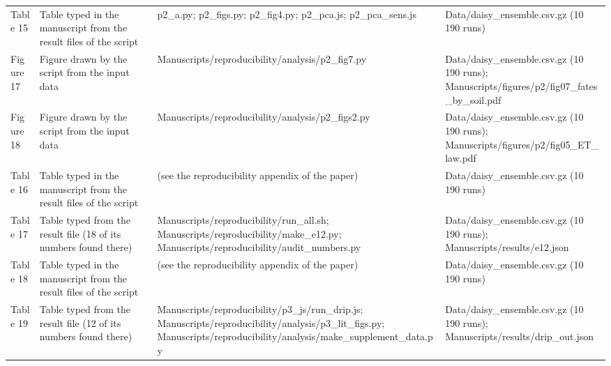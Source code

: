 {\begin{longtable}{p{}p{}p{}p{}}
{}Table 15 & Table typed in the manuscript from the result files of the script & p2\_\allowbreak{}a.py;  p2\_\allowbreak{}figs.py;  p2\_\allowbreak{}fig4.py;  p2\_\allowbreak{}pca.js;  p2\_\allowbreak{}pca\_\allowbreak{}sens.js & Data/\allowbreak{}daisy\_\allowbreak{}ensemble.csv.gz (10 190 runs)\\
{}Figure 17 & Figure drawn by the script from the input data & Manuscripts/\allowbreak{}reproducibility/\allowbreak{}analysis/\allowbreak{}p2\_\allowbreak{}fig7.py & Data/\allowbreak{}daisy\_\allowbreak{}ensemble.csv.gz (10 190 runs);  Manuscripts/\allowbreak{}figures/\allowbreak{}p2/\allowbreak{}fig07\_\allowbreak{}fates\_\allowbreak{}by\_\allowbreak{}soil.pdf\\
{}Figure 18 & Figure drawn by the script from the input data & Manuscripts/\allowbreak{}reproducibility/\allowbreak{}analysis/\allowbreak{}p2\_\allowbreak{}figs2.py & Data/\allowbreak{}daisy\_\allowbreak{}ensemble.csv.gz (10 190 runs);  Manuscripts/\allowbreak{}figures/\allowbreak{}p2/\allowbreak{}fig05\_\allowbreak{}ET\_\allowbreak{}law.pdf\\
{}Table 16 & Table typed in the manuscript from the result files of the script & (see the reproducibility appendix of the paper) & Data/\allowbreak{}daisy\_\allowbreak{}ensemble.csv.gz (10 190 runs)\\
{}Table 17 & Table typed from the result file (18 of its numbers found there) & Manuscripts/\allowbreak{}reproducibility/\allowbreak{}run\_\allowbreak{}all.sh;  Manuscripts/\allowbreak{}reproducibility/\allowbreak{}make\_\allowbreak{}e12.py;  Manuscripts/\allowbreak{}reproducibility/\allowbreak{}audit\_\allowbreak{}numbers.py & Data/\allowbreak{}daisy\_\allowbreak{}ensemble.csv.gz (10 190 runs);  Manuscripts/\allowbreak{}results/\allowbreak{}e12.json\\
{}Table 18 & Table typed in the manuscript from the result files of the script & (see the reproducibility appendix of the paper) & Data/\allowbreak{}daisy\_\allowbreak{}ensemble.csv.gz (10 190 runs)\\
{}Table 19 & Table typed from the result file (12 of its numbers found there) & Manuscripts/\allowbreak{}reproducibility/\allowbreak{}p3\_\allowbreak{}js/\allowbreak{}run\_\allowbreak{}drip.js;  Manuscripts/\allowbreak{}reproducibility/\allowbreak{}analysis/\allowbreak{}p3\_\allowbreak{}lit\_\allowbreak{}figs.py;  Manuscripts/\allowbreak{}reproducibility/\allowbreak{}analysis/\allowbreak{}make\_\allowbreak{}supplement\_\allowbreak{}data.py & Data/\allowbreak{}daisy\_\allowbreak{}ensemble.csv.gz (10 190 runs);  Manuscripts/\allowbreak{}results/\allowbreak{}drip\_\allowbreak{}out.json\\

\end{longtable}}
